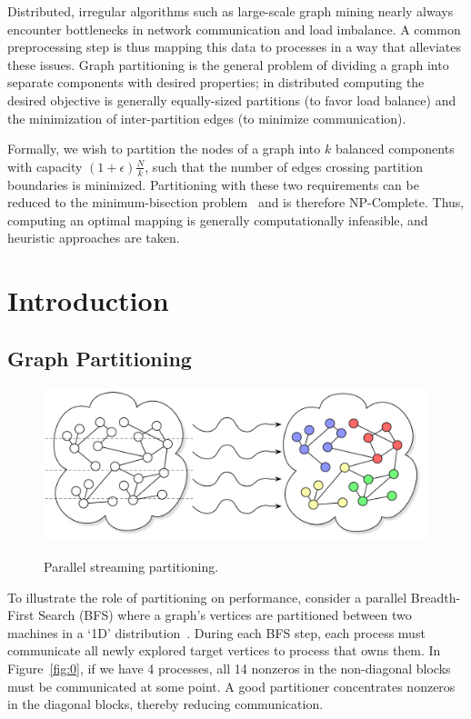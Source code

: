 
Distributed, irregular algorithms such as large-scale graph mining nearly always encounter bottlenecks in network communication and load imbalance. A common preprocessing step is thus mapping this data to processes in a way that alleviates these issues. Graph partitioning is the general problem of dividing a graph into separate components with desired properties; in distributed computing the desired objective is generally equally-sized partitions (to favor load balance) and the minimization of inter-partition edges (to minimize communication).

Formally, we wish to partition the nodes of a graph into $k$ balanced components with capacity $(1+\epsilon)\frac{N}{k}$, such that the number of edges crossing partition boundaries is minimized. Partitioning with these two requirements can be reduced to the minimum-bisection problem~\cite{Garey:1979:CIG:578533} and is therefore NP-Complete. Thus, computing an optimal mapping is generally computationally infeasible, and heuristic approaches are taken. 

\section{Introduction}
\subsection{Graph Partitioning}
\begin{figure}[ht]
\centering
  \includegraphics[width=0.7\columnwidth]{figures/coverfig.pdf}
  \label{fig:coverfig}
  \caption{Parallel streaming partitioning.}
\end{figure}

To illustrate the role of partitioning on performance, consider a parallel Breadth-First Search (BFS) where a graph's vertices are partitioned between two machines in a `1D' distribution~\cite{}. During each BFS step, each process must communicate all newly explored target vertices to process that owns them. In Figure~\ref{fig:0}, if we have 4 processes, all 14 nonzeros in the non-diagonal blocks must be communicated at some point.
A good partitioner concentrates nonzeros in the diagonal blocks, thereby reducing communication.

